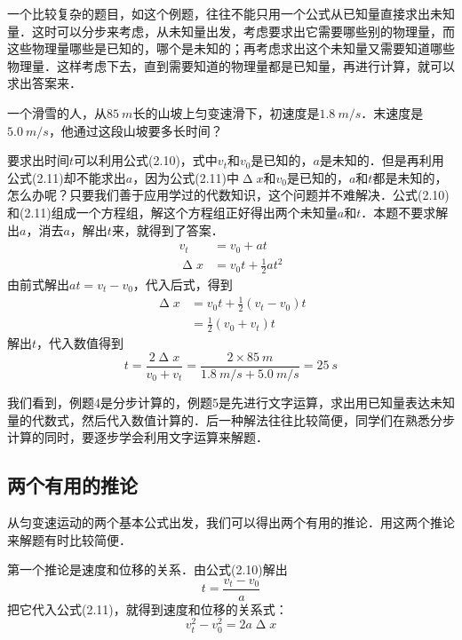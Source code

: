 一个比较复杂的题目，如这个例题，往往不能只用一个公式从已知量直接求出未知量．这时可以分步来考虑，从未知量出发，考虑要求出它需要哪些别的物理量，而这些物理量哪些是已知的，哪个是未知的；再考虑求出这个未知量又需要知道哪些物理量．这样考虑下去，直到需要知道的物理量都是已知量，再进行计算，就可以求出答案来．

\begin{example}
    一个滑雪的人，从$\qty{85}{m}$长的山坡上匀变速滑下，初速度是$\qty{1.8}{m/s}$．末速度是$\qty{5.0}{m/s}$，他通过这段山坡要多长时间？
\end{example}

\begin{solution}
    要求出时间$t$可以利用公式(2.10)，式中$v_t$和$v_0$是已知的，$a$是未知的．但是再利用公式(2.11)却不能求出$a$，因为公式(2.11)中$\upDelta x$和$v_0$是已知的，$a$和$t$都是未知的，怎么办呢？只要我们善于应用学过的代数知识，这个问题并不难解决．公式(2.10)和(2.11)组成一个方程组，解这个方程组正好得出两个未知量$a$和$t$．本题不要求解出$a$，消去$a$，解出$t$来，就得到了答案．
    \begin{align*}
        v_t        & =v_0+at                \\
        \upDelta x & =v_0 t+\frac{1}{2}at^2
    \end{align*}
    由前式解出$at=v_t-v_0$，代入后式，得到
    \[\begin{split}
            \upDelta x & =v_0t+\frac{1}{2}(v_t-v_0)t \\
                       & =\frac{1}{2}(v_0+v_t)t
        \end{split} \]
    解出$t$，代入数值得到
    \[t=\frac{2\upDelta x}{v_0+v_t}=\frac{2\times \qty{85}{m}}{\qty{1.8}{m/s}+\qty{5.0}{m/s}}=\qty{25}{s} \]
\end{solution}

我们看到，例题4是分步计算的，例题5是先进行文字运算，求出用已知量表达未知量的代数式，然后代入数值计算的．后一种解法往往比较简便，同学们在熟悉分步计算的同时，要逐步学会利用文字运算来解题．

\subsection{两个有用的推论}

从匀变速运动的两个基本公式出发，我们可以得出两个有用的推论．用这两个推论来解题有时比较简便．

第一个推论是速度和位移的关系．由公式(2.10)解出
\[t=\frac{v_t-v_0}{a} \]
把它代入公式(2.11)，就得到速度和位移的关系式：
\begin{equation}
    v^2_t-v^2_0=2a\upDelta x
\end{equation}

